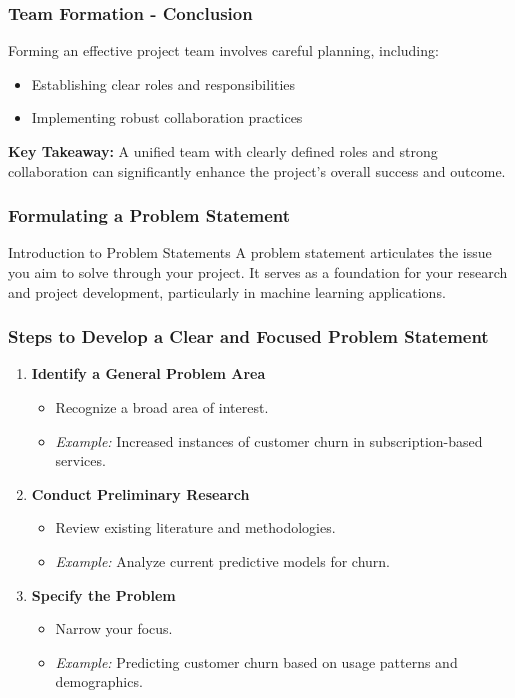 \documentclass[aspectratio=169]{beamer}
\begin{document}
\begin{frame}[fragile]
    \frametitle{Team Formation - Conclusion}
    Forming an effective project team involves careful planning, including:
    \begin{itemize}
        \item Establishing clear roles and responsibilities
        \item Implementing robust collaboration practices
    \end{itemize}
    
    \textbf{Key Takeaway:} A unified team with clearly defined roles and strong collaboration can significantly enhance the project's overall success and outcome.
\end{frame}

\begin{frame}[fragile]
    \frametitle{Formulating a Problem Statement}
    \begin{block}{Introduction to Problem Statements}
        A problem statement articulates the issue you aim to solve through your project. It serves as a foundation for your research and project development, particularly in machine learning applications.
    \end{block}
\end{frame}

\begin{frame}[fragile]
    \frametitle{Steps to Develop a Clear and Focused Problem Statement}
    \begin{enumerate}
        \item \textbf{Identify a General Problem Area}
            \begin{itemize}
                \item Recognize a broad area of interest.
                \item \textit{Example:} Increased instances of customer churn in subscription-based services.
            \end{itemize}
        \item \textbf{Conduct Preliminary Research}
            \begin{itemize}
                \item Review existing literature and methodologies.
                \item \textit{Example:} Analyze current predictive models for churn.
            \end{itemize}
        \item \textbf{Specify the Problem}
            \begin{itemize}
                \item Narrow your focus.
                \item \textit{Example:} Predicting customer churn based on usage patterns and demographics.
            \end{itemize}
    \end{enumerate}
\end{frame}
\end{document}
